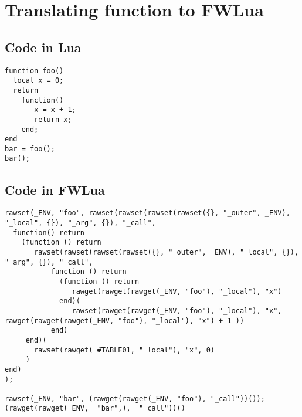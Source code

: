\chapter{Translating function to FWLua\label{app:function}}

\section{Code in Lua}

\begin{verbatim}
function foo()
  local x = 0;
  return 
    function() 
       x = x + 1;
       return x; 
    end;
end
bar = foo();
bar();
\end{verbatim}

\section{Code in FWLua}

\begin{verbatim}
rawset(_ENV, "foo", rawset(rawset(rawset(rawset({}, "_outer", _ENV), "_local", {}), "_arg", {}), "_call",
  function() return
    (function () return
       rawset(rawset(rawset(rawset({}, "_outer", _ENV), "_local", {}), "_arg", {}), "_call",
           function () return
             (function () return
                rawget(rawget(rawget(_ENV, "foo"), "_local"), "x")
             end)(
                rawset(rawget(rawget(_ENV, "foo"), "_local"), "x",   rawget(rawget(rawget(_ENV, "foo"), "_local"), "x") + 1 ))
           end)
     end)(
       rawset(rawget(_#TABLE01, "_local"), "x", 0)
     )
end)
);

rawset(_ENV, "bar", (rawget(rawget(_ENV, "foo"), "_call"))());
(rawget(rawget(_ENV,  "bar",),  "_call"))()
\end{verbatim}
